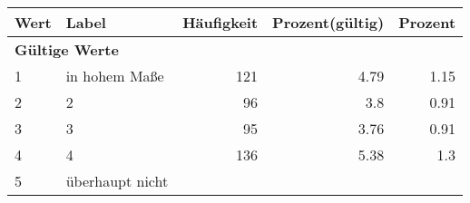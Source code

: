      \begin{longtable}{lXrrr}
     \toprule
     \textbf{Wert} & \textbf{Label} & \textbf{Häufigkeit} & \textbf{Prozent(gültig)} & \textbf{Prozent} \\
     \endhead
     \midrule
     \multicolumn{5}{l}{\textbf{Gültige Werte}}\\

     1 &
     \multicolumn{1}{X}{ in hohem Maße   } &


       \num{121} &
       \num[round-mode=places,round-precision=2]{4,79} &
         \num[round-mode=places,round-precision=2]{1,15} \\

     2 &
     \multicolumn{1}{X}{ 2   } &


       \num{96} &
       \num[round-mode=places,round-precision=2]{3,8} &
         \num[round-mode=places,round-precision=2]{0,91} \\

     3 &
     \multicolumn{1}{X}{ 3   } &


       \num{95} &
       \num[round-mode=places,round-precision=2]{3,76} &
         \num[round-mode=places,round-precision=2]{0,91} \\

     4 &
     \multicolumn{1}{X}{ 4   } &


       \num{136} &
       \num[round-mode=places,round-precision=2]{5,38} &
         \num[round-mode=places,round-precision=2]{1,3} \\

     5 &
     \multicolumn{1}{X}{ überhaupt nicht   } &



\end{longtable}
